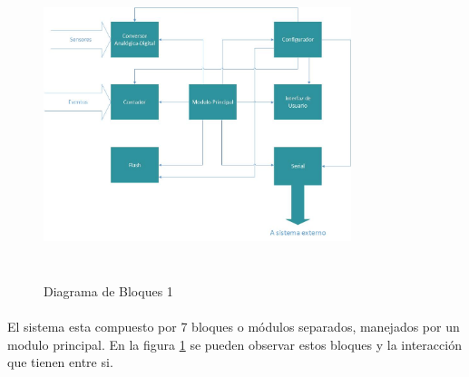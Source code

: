 \documentclass{article}
\theoremstyle{definition}
\theoremstyle{remark}
\begin{document}
\begin{figure}[h]
  \centering
  \includegraphics[width=0.80\textwidth, height = 9cm]{Bloques1}
  \caption{Diagrama de Bloques 1}\label{fig:bloques1}
\end{figure}

\paragraph{}
El sistema esta compuesto por 7 bloques o módulos separados, manejados por un modulo principal. En la figura \ref{fig:bloques1} se pueden observar estos bloques y la interacción que tienen entre si.
\paragraph{}
\end{document}
